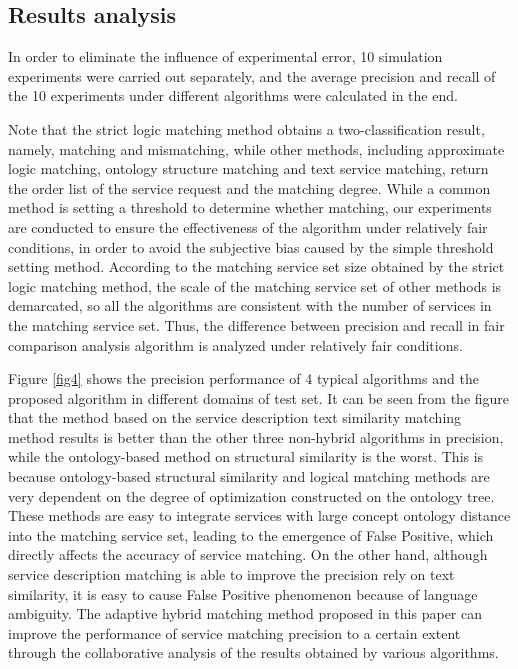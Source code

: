 \documentclass{ieeeaccess}
\begin{document}
\subsection{Results analysis}
In order to eliminate the influence of experimental error, 10 simulation experiments were carried out separately, and the average precision and recall of the 10 experiments under different algorithms were calculated in the end.

Note that the strict logic matching method obtains a two-classification result, namely, matching and mismatching, while other methods, including approximate logic matching, ontology structure matching and text service matching, return the order list of the service request and the matching degree. While a common method is setting a threshold to determine whether matching, our experiments are conducted to ensure the effectiveness of the algorithm under relatively fair conditions, in order to avoid the subjective bias caused by the simple threshold setting method. According to the matching service set size obtained by the strict logic matching method, the scale of the matching service set of other methods is demarcated, so all the algorithms are consistent with the number of services in the matching service set. Thus, the difference between precision and recall in fair comparison analysis algorithm is analyzed under relatively fair conditions.

Figure \ref{fig4} shows the precision performance of 4 typical algorithms and the proposed algorithm in different domains of test set. It can be seen from the figure that the method based on the service description text similarity matching method results is better than the other three non-hybrid algorithms in precision, while the ontology-based method on structural similarity is the worst. This is because ontology-based structural similarity and logical matching methods are very dependent on the degree of optimization constructed on the ontology tree. These methods are easy to integrate services with large concept ontology distance into the matching service set, leading to the emergence of False Positive, which directly affects the accuracy of service matching. On the other hand, although service description matching is able to improve the precision rely on text similarity, it is easy to cause False Positive phenomenon because of language ambiguity. The adaptive hybrid matching method proposed in this paper can improve the performance of service matching precision to a certain extent through the collaborative analysis of the results obtained by various algorithms.
\end{document}
